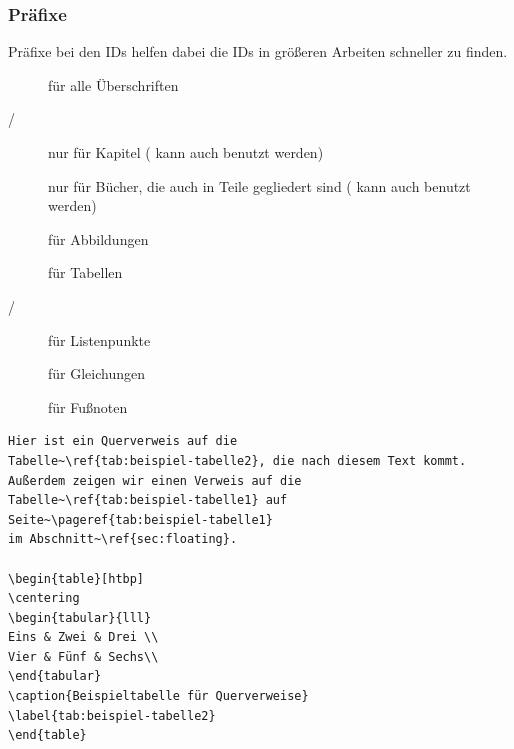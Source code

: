 \begin{frame}[fragile]
\frametitle{Präfixe}

Präfixe bei den IDs helfen dabei die IDs in größeren Arbeiten schneller zu finden. 

\begin{description}
\item[] für alle Überschriften
\item[/] nur für Kapitel ( kann auch benutzt werden)
\item[] nur für Bücher, die auch in Teile gegliedert sind ( kann auch benutzt werden)
\item[] für Abbildungen
\item[] für Tabellen
\item[/] für Listenpunkte
\item[] für Gleichungen
\item[] für Fußnoten
\end{description}

\end{frame}

\begin{frame}[fragile]


{\small 
	
\begin{lstlisting}
Hier ist ein Querverweis auf die 
Tabelle~\ref{tab:beispiel-tabelle2}, die nach diesem Text kommt. 
Außerdem zeigen wir einen Verweis auf die 
Tabelle~\ref{tab:beispiel-tabelle1} auf 
Seite~\pageref{tab:beispiel-tabelle1} 
im Abschnitt~\ref{sec:floating}.

\begin{table}[htbp]
\centering
\begin{tabular}{lll}
Eins & Zwei & Drei \\
Vier & Fünf & Sechs\\
\end{tabular}
\caption{Beispieltabelle für Querverweise}
\label{tab:beispiel-tabelle2}
\end{table}
\end{lstlisting}
}
\end{frame}



